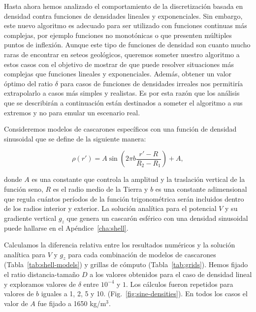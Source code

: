 Hasta ahora hemos analizado el comportamiento de la discretización basada en
densidad contra funciones de densidades lineales y exponenciales.
Sin embargo, este nuevo algoritmo es adecuado para ser utilizado con funciones
continuas más complejas, por ejemplo funciones no monotónicas o que presenten
múltiples puntos de inflexión.
Aunque este tipo de funciones de densidad son cuanto mucho raras de encontrar
en seteos geológicos, queremos someter nuestro algoritmo a estos casos con el
objetivo de mostrar de que puede resolver situaciones más complejas que
funciones lineales y exponenciales.
Además, obtener un valor óptimo del ratio $\delta$ para casos de funciones de
densidades irreales nos permitiría extrapolarlo a casos más simples
y realistas.
Es por esta razón que los análisis que se describirán a continuación están
destinados a someter el algoritmo a sus extremos y no para emular un escenario
real.

Consideremos modelos de cascarones específicos con una función de densidad
sinusoidal que se define de la siguiente manera:

\begin{equation}
    \rho(r') = A \sin \left( 2 \pi b \frac{r' - R}{R_2 - R_1} \right) + A,
    \label{eq:density-sine}
\end{equation}

\noindent donde $A$ es una constante que controla la amplitud y la traslación
vertical de la función seno, $R$ es el radio medio de la Tierra y $b$ es una
constante adimensional que regula cuántos períodos de la función trigonométrica
serán incluidos dentro de los radios interior y exterior.
La solución analítica para el potencial $V$ y su gradiente vertical $g_z$ que
genera un cascarón esférico con una densidad sinusoidal puede hallarse en el
Apéndice~\ref{cha:shell}.

Calculamos la diferencia relativa entre los resultados numéricos y la solución
analítica para $V$ y $g_z$ para cada combinación de modelos de cascarones
(Tabla~\ref{tab:shell-models}) y grillas de cómputo (Tabla~\ref{tab:grids}).
Hemos fijado el ratio distancia-tamaño $D$ a los valores obtenidos para el caso
de densidad lineal y exploramos valores de $\delta$ entre $10^{-4}$ y $1$. Los
cálculos fueron repetidos para valores de $b$ iguales a 1, 2, 5 y 10.
(Fig.~\ref{fig:sine-densities}). En todos los casos el valor de $A$ fue fijado
a 1650 kg/m$^3$.

